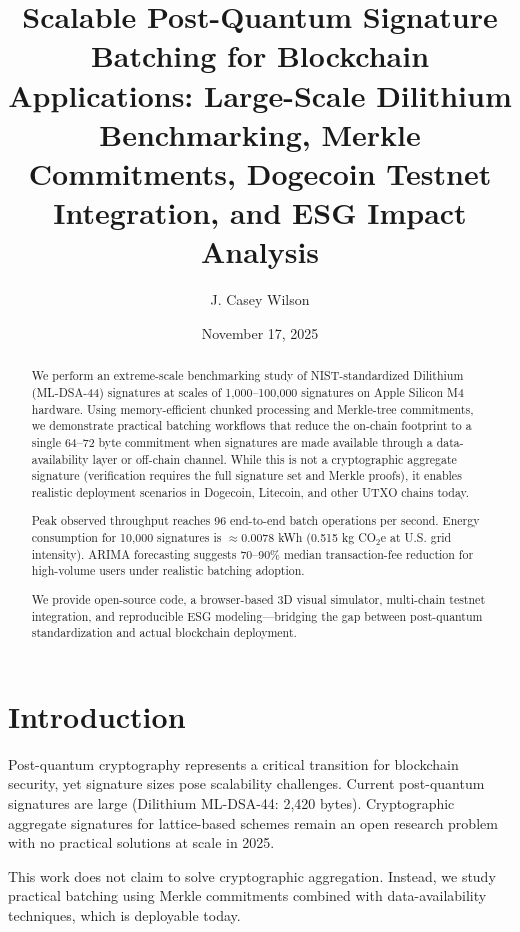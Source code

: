 \documentclass[iacr,final]{iacrtrans}
\title[Scalable PQ Signature Batching]{Scalable Post-Quantum Signature Batching for Blockchain Applications: Large-Scale Dilithium Benchmarking, Merkle Commitments, Dogecoin Testnet Integration, and ESG Impact Analysis}
\author{J. Casey Wilson\inst{1}}
\institute{
  The Odenrider Group, LLC, ID, USA, \email{research@odenridergroupllc.com}
}
\date{November 17, 2025}
\begin{document}
\maketitle


\begin{abstract}
We perform an extreme-scale benchmarking study of NIST-standardized Dilithium (ML-DSA-44) signatures at scales of 1,000--100,000 signatures on Apple Silicon M4 hardware. Using memory-efficient chunked processing and Merkle-tree commitments, we demonstrate practical batching workflows that reduce the on-chain footprint to a single 64--72 byte commitment when signatures are made available through a data-availability layer or off-chain channel. While this is not a cryptographic aggregate signature (verification requires the full signature set and Merkle proofs), it enables realistic deployment scenarios in Dogecoin, Litecoin, and other UTXO chains today.

Peak observed throughput reaches 96 end-to-end batch operations per second. Energy consumption for 10,000 signatures is $\approx$0.0078 kWh (0.515 kg CO$_2$e at U.S. grid intensity). ARIMA forecasting suggests 70--90\% median transaction-fee reduction for high-volume users under realistic batching adoption.

We provide open-source code, a browser-based 3D visual simulator, multi-chain testnet integration, and reproducible ESG modeling---bridging the gap between post-quantum standardization and actual blockchain deployment.
\end{abstract}

\section{Introduction}
\label{sec:introduction}

Post-quan\-tum cryptography represents a critical transition for blockchain security, yet signature sizes pose scalability challenges. Current post-quan\-tum signatures are large (Dilithium ML-DSA-44: 2,420 bytes). Cryptographic aggregate signatures for lattice-based schemes remain an open research problem with no practical solutions at scale in 2025.

This work does not claim to solve cryptographic aggregation. Instead, we study practical batching using Merkle commitments combined with data-availability techniques, which is deployable today.
\end{document}
